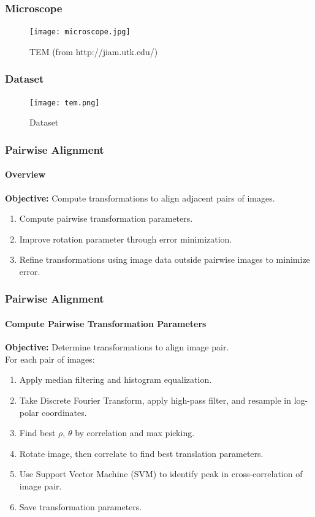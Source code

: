 \documentclass{beamer}
\begin{document}
\begin{frame}
\frametitle{Microscope}
\begin{figure}[p]
	\centering
	\texttt{[image: microscope.jpg]}
	\caption{TEM (from http://jiam.utk.edu/)}
	\label{fig:Microscope}
\end{figure}
\end{frame}

\begin{frame}
\frametitle{Dataset}
\begin{figure}[p]
	\centering
	\texttt{[image: tem.png]}
	\caption{Dataset}
	\label{fig:Dataset}
\end{figure}
\end{frame}

\begin{frame}
\frametitle{Pairwise Alignment}
\framesubtitle{Overview}
\textbf{Objective:} Compute transformations to align adjacent pairs of images. \\
\begin{enumerate}
\item Compute pairwise transformation parameters.
\item Improve rotation parameter through error minimization.
\item Refine transformations using image data outside pairwise images to minimize error.
\end{enumerate}
\end{frame}

\begin{frame}
\frametitle{Pairwise Alignment}
\framesubtitle{Compute Pairwise Transformation Parameters}
\textbf{Objective:} Determine transformations to align image pair. \\
For each pair of images:
\begin{enumerate}
\item Apply median filtering and histogram equalization. 
\item Take Discrete Fourier Transform, apply high-pass filter, and resample in log-polar coordinates. 
\item Find best $\rho$, $\theta$ by correlation and max picking. 
\item Rotate image, then correlate to find best translation parameters.
\item Use Support Vector Machine (SVM) to identify peak in cross-correlation of image pair. 
\item Save transformation parameters.
\end{enumerate}
\end{frame}
\end{document}
